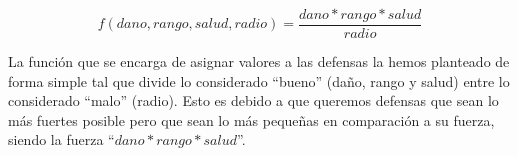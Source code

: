 $$ f(dano,rango,salud,radio)=\frac{dano*rango*salud}{radio} $$

La función que se encarga de asignar valores a las defensas la hemos planteado de forma simple tal que divide lo considerado ``bueno'' (daño, rango y salud) entre lo considerado ``malo'' (radio). Esto es debido a que queremos defensas que sean lo más fuertes posible pero que sean lo más pequeñas en comparación a su fuerza, siendo la fuerza ``$dano*rango*salud$''.